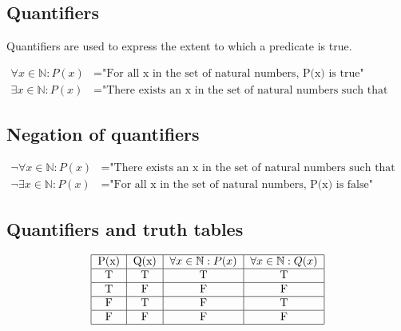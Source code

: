 \documentclass{article}
\begin{document}
\subsection{Quantifiers}

Quantifiers are used to express the extent to which a predicate is true.

\begin{align*}
    \forall x \in \mathbb{N} : P(x) & = \text{"For all x in the set of natural numbers, P(x) is true"} \\
    \exists x \in \mathbb{N} : P(x) & = \text{"There exists an x in the set of natural numbers such that P(x) is true"}
\end{align*}

\subsection{Negation of quantifiers}

\begin{align*}
    \neg \forall x \in \mathbb{N} : P(x) & = \text{"There exists an x in the set of natural numbers such that P(x) is false"} \\
    \neg \exists x \in \mathbb{N} : P(x) & = \text{"For all x in the set of natural numbers, P(x) is false"}
\end{align*}

\subsection{Quantifiers and truth tables}

\begin{align*}
    \begin{tabular}{|c|c|c|c|}
        \hline
        P(x) & Q(x) & $\forall x \in \mathbb{N} : P(x)$ & $\forall x \in \mathbb{N} : Q(x)$ \\
        \hline
        T    & T    & T                                  & T                                \\
        \hline
        T    & F    & F                                  & F                                \\
        \hline
        F    & T    & F                                  & T                                \\
        \hline
        F    & F    & F                                  & F                                \\
        \hline
    \end{tabular}
\end{align*}
\end{document}
